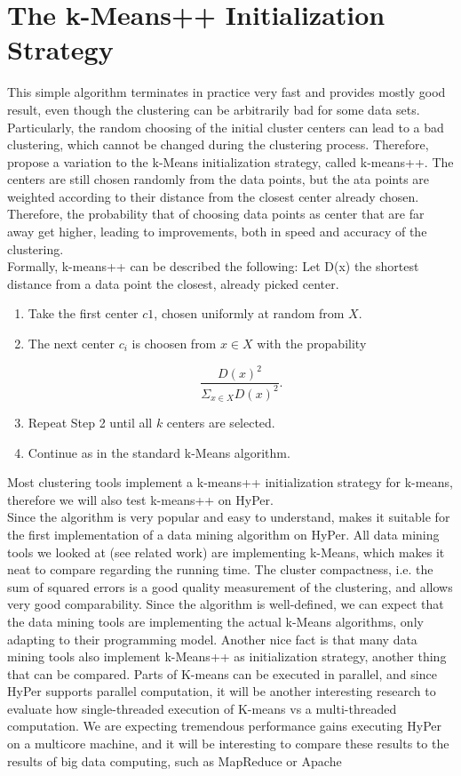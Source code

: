 \section{The k-Means++ Initialization Strategy}

This simple algorithm terminates in practice very fast and provides mostly good result, even though the clustering can be arbitrarily bad for some data sets. Particularly, the random choosing of the initial cluster centers can lead to a bad clustering, which cannot be changed during the clustering process. Therefore,  propose a variation to the k-Means initialization strategy, called k-means++. The centers are still chosen randomly from the data points, but the ata points are weighted according to their distance from the closest center already chosen. Therefore, the probability that of choosing data points as center that are far away get higher, leading to improvements, both in speed and accuracy of the clustering.
\\
Formally, k-means++ can be described the following:
Let D(x) the shortest distance from a data point the closest, already picked center. 

\begin{enumerate} 
\item Take the first center $c1$, chosen uniformly at random from $X$.
\item The next center $c_i$ is choosen from $x \in X$ with the propability 

\begin{equation*}
\frac {D(x)^2} {\Sigma_{x \in X} D(x)^2}.
\end{equation*}

\item Repeat Step 2 until all $k$ centers are selected.
\item Continue as in the standard k-Means algorithm.
\end{enumerate}

Most clustering tools implement a k-means++ initialization strategy for k-means, therefore we will also test k-means++ on HyPer.
\\
Since the algorithm is very popular and easy to understand, makes it suitable for the first implementation of a data mining algorithm on HyPer. All data mining tools we looked at (see related work) are implementing k-Means, which makes it neat to compare regarding the running time. The cluster compactness, i.e. the sum of squared errors is a good quality measurement of the clustering, and allows very good comparability. Since the algorithm is well-defined, we can expect that the data mining tools are implementing the actual k-Means algorithms, only adapting to their programming model. Another nice fact is that many data mining tools also implement k-Means++ as initialization strategy, another thing that can be compared.
Parts of K-means can be executed in parallel, and since HyPer supports parallel computation, it will be another interesting research to evaluate how single-threaded execution of K-means vs a multi-threaded computation. We are expecting tremendous performance gains executing HyPer on a multicore machine, and it will be interesting to compare these results to the results of big data computing, such as MapReduce or Apache 


